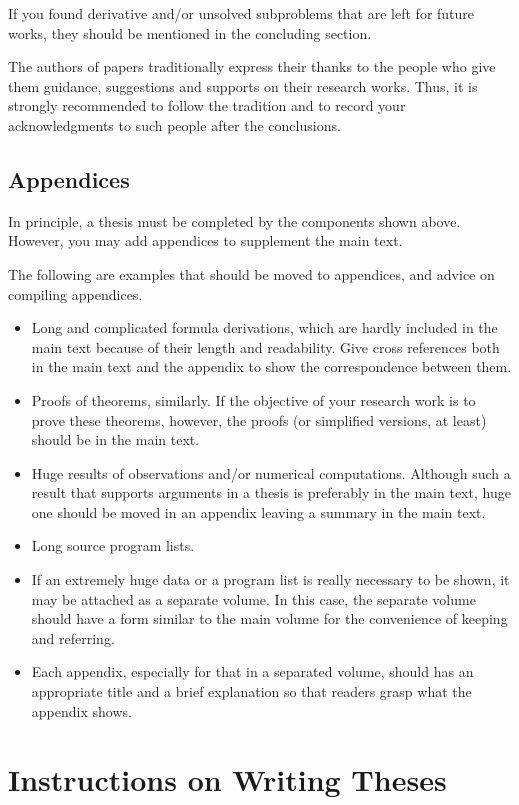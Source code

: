 \documentclass[master,english]{kuisthesis}
\begin{document}
If you found derivative and/or unsolved subproblems that are left for
future works, they should be mentioned in the concluding section.

The authors of papers traditionally express their thanks to the people who
give them guidance, suggestions and supports on their research works.  Thus,
it is strongly recommended to follow the tradition and to record your
acknowledgments to such people after the conclusions.

\subsection{Appendices}\label{subsec-appendix}
In principle, a thesis must be completed by the components shown above.
However, you may add appendices to supplement the main text.

The following are examples that should be moved to appendices, and advice
on compiling appendices.
\begin{itemize}%
\item
Long and complicated formula derivations, which are hardly included in the
main text because of their length and readability.  Give cross references
both in the main text and the appendix to show the correspondence between
them.
\item
Proofs of theorems, similarly.  If the objective of your research work is to
prove these theorems, however, the proofs (or simplified versions, at least)
should be in the main text.
\item
Huge results of observations and/or numerical computations.  Although such a
result that supports arguments in a thesis is preferably in the main text,
huge one should be moved in an appendix leaving a summary in the main text.
\item
Long source program lists.
\item
If an extremely huge data or a program list is really necessary to be shown,
it may be attached as a separate volume.  In this case, the separate volume
should have a form similar to the main volume for the convenience of keeping
and referring.
\item
Each appendix, especially for that in a separated volume, should has an
appropriate title and a brief explanation so that readers grasp what the
appendix shows.
\end{itemize}%

\section{Instructions on Writing Theses}\label{sec-instruction}
\end{document}
